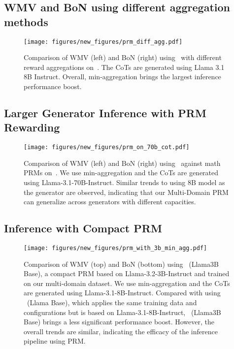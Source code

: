 \clearpage


\subsection{WMV and BoN using different aggregation methods}
\label{sec:agg-comp3}


\begin{figure*}[ht]
    \begin{center}
        \texttt{[image: figures/new\_figures/prm\_diff\_agg.pdf]}        
        \caption{Comparison of WMV (left) and BoN (right) using \ourprm~with different reward aggregations on~\ourdataeval. The CoTs are generated using Llama 3.1 8B Instruct. Overall, min-aggregation brings the largest inference performance boost.}
        \label{fig:prm-diff-agg2}
    \end{center}
\end{figure*}


\clearpage


\subsection{Larger Generator Inference with PRM Rewarding}
\label{sec:agg-comp}


\begin{figure*}[ht]
    \begin{center}
        \texttt{[image: figures/new\_figures/prm\_on\_70b\_cot.pdf]}        
        \caption{Comparison of WMV (left) and BoN (right) using \ourprm~against math PRMs on~\ourdataeval. We use min-aggregation and the CoTs are generated using Llama-3.1-70B-Instruct. Similar trends to using 8B model as the generator are observed, indicating that our Multi-Domain PRM can generalize across generators with different capacities.}
        \label{fig:prm-diff-agg}
    \end{center}
\end{figure*}


\clearpage


\subsection{Inference with Compact PRM}
\label{sec:agg-comp2}


\begin{figure*}[ht]
    \begin{center}
        \texttt{[image: figures/new\_figures/prm\_with\_3b\_min\_agg.pdf]}        
        \caption{Comparison of WMV (top) and BoN (bottom) using \ourprm~(Llama3B Base), a compact PRM based on Llama-3.2-3B-Instruct and trained on our multi-domain dataset. We use min-aggregation and the CoTs are generated using Llama-3.1-8B-Instruct. Compared with using \ourprm~(Llama Base), which applies the same training data and configurations but is based on Llama-3.1-8B-Instruct, \ourprm~(Llama3B Base) brings a less significant performance boost. However, the overall trends are similar, indicating the efficacy of the inference pipeline using PRM.}
        \label{fig:prm-diff-agg1}
    \end{center}
\end{figure*}

